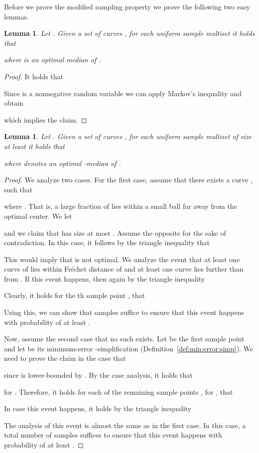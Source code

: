 \documentclass[11pt, letter]{article}
\newtheorem{lemma}[theorem]{Lemma}
\newcommand{\lemlab}[1]{\label{lemma:#1}}
\newcommand{\defref}[1]{Definition~\ref{def:#1}}
\newcommand{\Frechet}{Fr\'echet\xspace}
\begin{document}
Before we prove the modified sampling property we prove the following two easy
lemmas.


\begin{lemma}\lemlab{markov}
Let . Given a set of curves , for each uniform sample multiset
 it holds that 

where  is an optimal median of .
\end{lemma}

\begin{proof}
It holds that 

Since  is a nonnegative random variable we can apply Markov's inequality and obtain 

which implies the claim.
\end{proof}

\begin{lemma}\lemlab{diam:S}
Let . Given a set of curves , for each uniform sample multiset
 of size at least  it holds that 

where  denotes an optimal -median of .
\end{lemma}

\begin{proof}
We analyze two cases. For the first case, assume that there exists a curve , such that 
 
where .
That is, a large fraction of   lies within a small ball far away from the
optimal center. We let

and we claim that  has size at most .
Assume the opposite for the sake of contradiction. In this case, it follows by the triangle inequality that

This would imply that  is not optimal. 
We analyze the event that at least one curve of  lies within
\Frechet distance  of  and at least one curve lies further than  from
. If this event happens, then again by the triangle inequality 

Clearly, it holds for the th sample point , that

Using this, we can show that  samples suffice to ensure that this
event happens with probability of at least .

Now, assume the second case that no such  exists. Let  be the first
sample point and let  be its minimum-error -simplification
(\defref{min:error:simp}). We need to prove the claim in the case that

since  is lower-bounded by
. 
By the case analysis, it holds that 
 
for . Therefore, it holds for each of the remaining sample points , for , that

In case this event happens, it holds by the triangle inequality

The analysis of this event is almost the same as in the first case. In this
case, a total number of  samples suffices to ensure that this
event happens with probability of at least .
\end{proof}
\end{document}
